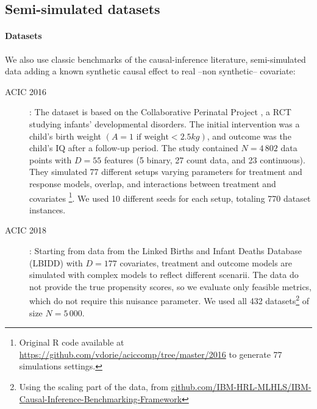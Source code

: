 \documentclass[french,12pt,twoside,a4paper]{book}
\begin{document}
\subsection{Semi-simulated datasets}\label{subsec:causal_model_selection:semi_simulated}

\paragraph{Datasets}

We also use classic benchmarks of the causal-inference
literature, semi-simulated data adding a known synthetic causal effect to real --non synthetic-- covariate:
\begin{description}
  \item[ACIC 2016] \citep{dorie_automated_2019}: The dataset is based on the
    Collaborative Perinatal Project \citep{niswander_women_1972}, a RCT
    studying infants’
    developmental disorders. The initial intervention was a child’s birth
    weight $(A = 1 \text{ if weight} < 2.5 kg)$, and outcome was the child’s
    IQ after a follow-up period. The study contained $N=4\,802$ data
    points with $D=55$ features (5 binary, 27 count data, and 23
    continuous). They simulated 77 different setups varying parameters
    for treatment and response models, overlap, and interactions between treatment and
    covariates \footnote{Original R code available at
      \url{https://github.com/vdorie/aciccomp/tree/master/2016}
      to generate 77 simulations settings.}. We used 10 different seeds for
    each setup, totaling 770 dataset instances.

  \item[ACIC 2018] \citep{shimoni_benchmarking_2018}: Starting from data
    from the Linked Births and Infant Deaths Database (LBIDD)
    \citep{macdorman_infant_1998} with $D=177$ covariates, treatment and
    outcome models are simulated with complex models to reflect
    different scenarii. The data do not provide the true propensity
    scores, so we evaluate only feasible metrics, which do not require this
    nuisance parameter. We used all 432 datasets\footnote{Using the scaling part of the data, from
      \href{https://github.com/IBM-HRL-MLHLS/IBM-Causal-Inference-Benchmarking-Framework}{github.com/IBM-HRL-MLHLS/IBM-Causal-Inference-Benchmarking-Framework}} of size $N=5\,000$.



\end{description}
\end{document}
